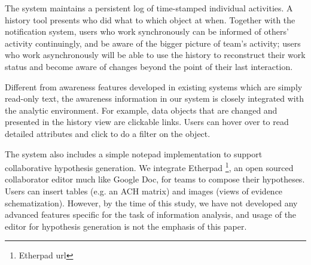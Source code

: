 The system maintains a persistent log of time-stamped individual activities. A history tool presents who did what to which object at when. Together with the notification system, users who work synchronously can be informed of others' activity continuingly, and be aware of the bigger picture of team's activity; users who work asynchronously will be able to use the history to reconstruct their work status and become aware of changes beyond the point of their last interaction. 
		
Different from awareness features developed in existing systems which are simply read-only text, the awareness information in our system is closely integrated with the analytic environment. For example, data objects that are changed and presented in the history view are clickable links. Users can hover over to read detailed attributes and click to do a filter on the object.  
		

The system also includes a simple notepad implementation to support collaborative hypothesis generation. We integrate Etherpad \footnote{Etherpad url}, an open sourced collaborator editor much like Google Doc, for teams to compose their hypotheses. Users can insert tables (e.g. an ACH matrix) and images (views of evidence schematization). However, by the time of this study, we have not developed any advanced features specific for the task of information analysis, and usage of the editor for hypothesis generation is not the emphasis of this paper. 
